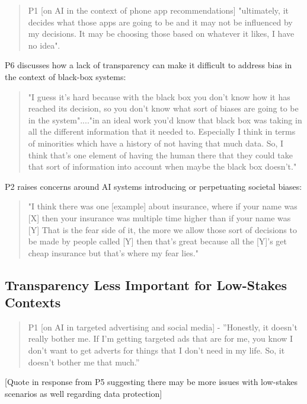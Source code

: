 \documentclass[manuscript,screen,review]{acmart}
\begin{document}
\begin{quote}
P1 [on AI in the context of phone app recommendations]  "ultimately, it decides what those apps are going to be and it may not be influenced by my decisions. It may be choosing those based on whatever it likes, I have no idea".
\end{quote}

P6 discusses how a lack of transparency can make it difficult to address bias in the context of black-box systems: 

\begin{quote}
"I guess it's hard because with the black box you don’t know how it has reached its decision, so you don’t know what sort of biases are going to be in the system"...."in an ideal work you'd know that black box was taking in all the different information that it needed to. Especially I think in terms of minorities which have a history of not having that much data. So, I think that’s one element of having the human there that they could take that sort of information into account when maybe the black box doesn’t."
\end{quote}

P2 raises concerns around AI systems introducing or perpetuating societal biases:

\begin{quote}
"I think there was one [example] about insurance, where if your name was [X] then your insurance was multiple time higher than if your name was [Y] That is the fear side of it, the more we allow those sort of decisions to be made by people called [Y] then that’s great because all the [Y]'s get cheap insurance but that’s where my fear lies."
\end{quote}



\subsection{Transparency Less Important for Low-Stakes Contexts}

\begin{quote}
P1 [on AI in targeted advertising and social media] - ''Honestly, it doesn’t really bother me. If I'm getting targeted ads that are for me, you know I don’t want to get adverts for things that I don’t need in my life. So, it doesn’t bother me that much.''
\end{quote}

[Quote in response from P5 suggesting there may be more issues with low-stakes scenarios as well regarding data protection]
\end{document}
